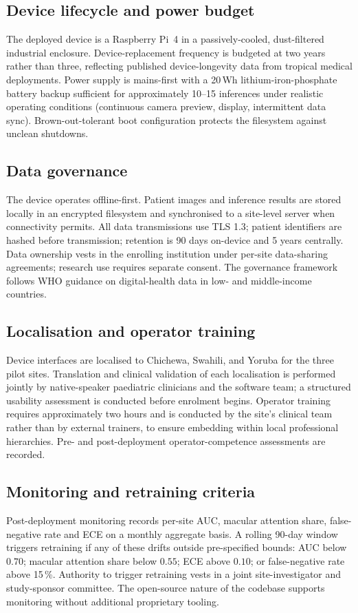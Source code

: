 \documentclass[twocolumn,10pt]{article}
\begin{document}
\subsection{Device lifecycle and power budget}
The deployed device is a Raspberry Pi~4 in a passively-cooled,
dust-filtered industrial enclosure. Device-replacement frequency
is budgeted at two years rather than three, reflecting published
device-longevity data from tropical medical deployments. Power
supply is mains-first with a 20\,Wh lithium-iron-phosphate
battery backup sufficient for approximately 10--15 inferences
under realistic operating conditions (continuous camera preview,
display, intermittent data sync). Brown-out-tolerant boot
configuration protects the filesystem against unclean shutdowns.

\subsection{Data governance}
The device operates offline-first. Patient images and inference
results are stored locally in an encrypted filesystem and
synchronised to a site-level server when connectivity permits.
All data transmissions use TLS 1.3; patient identifiers are
hashed before transmission; retention is 90 days on-device and
5 years centrally. Data ownership vests in the enrolling
institution under per-site data-sharing agreements; research use
requires separate consent. The governance framework follows WHO
guidance on digital-health data in low- and middle-income
countries.

\subsection{Localisation and operator training}
Device interfaces are localised to Chichewa, Swahili, and Yoruba
for the three pilot sites. Translation and clinical validation of
each localisation is performed jointly by native-speaker
paediatric clinicians and the software team; a structured
usability assessment is conducted before enrolment begins.
Operator training requires approximately two hours and is
conducted by the site's clinical team rather than by external
trainers, to ensure embedding within local professional
hierarchies. Pre- and post-deployment operator-competence
assessments are recorded.

\subsection{Monitoring and retraining criteria}
Post-deployment monitoring records per-site AUC, macular
attention share, false-negative rate and ECE on a monthly
aggregate basis. A rolling 90-day window triggers retraining if
any of these drifts outside pre-specified bounds: AUC below
$0.70$; macular attention share below $0.55$; ECE above $0.10$;
or false-negative rate above 15\,\%. Authority to trigger
retraining vests in a joint site-investigator and study-sponsor
committee. The open-source nature of the codebase supports
monitoring without additional proprietary tooling.
\end{document}
